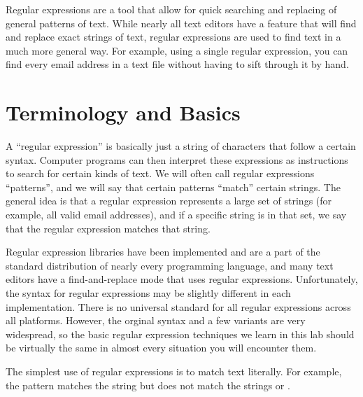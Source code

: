 \label{lab:Regex_Basic}

Regular expressions are a tool that allow for quick searching and replacing of general patterns of text.
While nearly all text editors have a feature that will find and replace exact strings of text, regular expressions are used to find text in a much more general way. For example, using a single regular expression, you can find every email address in a text file without having to sift through it by hand.

\section*{Terminology and Basics}
A ``regular expression'' is basically just a string of characters that follow a certain syntax. Computer programs can then interpret these expressions as instructions to search for certain kinds of text. We will often call regular expressions ``patterns'', and we will say that certain patterns ``match'' certain strings. The general idea is that a regular expression represents a large set of strings (for example, all valid email addresses), and if a specific string is in that set, we say that the regular expression matches that string.

\begin{warn} %
Regular expression libraries have been implemented and are a part of the standard distribution of nearly every programming language, and many text editors have a find-and-replace mode that uses regular expressions. Unfortunately, the syntax for regular expressions may be slightly different in each implementation. There is no universal standard for all regular expressions across all platforms. However, the orginal syntax and a few variants are very widespread, so the basic regular expression techniques we learn in this lab should be virtually the same in almost every situation you will encounter them.
\end{warn}

The simplest use of regular expressions is to match text literally.
For example, the pattern  matches the string  but does not match the strings  or .

